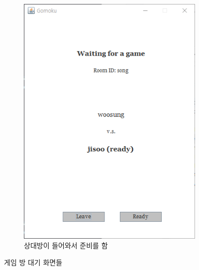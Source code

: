 \documentclass[a4paper, 10pt]{article}
\begin{document}
\begin{figure}[h]
\begin{subfigure}{.3\textwidth}
    \includegraphics[width=.9\linewidth]{resource/room}
    \caption{상대방이 들어와서 준비를 함}
    \label{fig:room}
  \end{subfigure}
  \caption{게임 방 대기 화면들}
\end{figure}
\newpage
\end{document}
